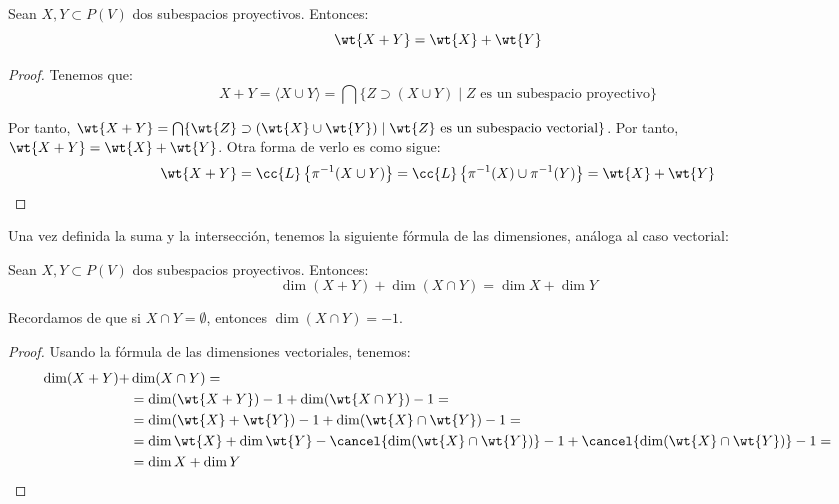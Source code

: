 \begin{prop}
    Sean $X,Y\subset P(V)$ dos subespacios proyectivos. Entonces:
    \begin{equation*}
        \wt{X+Y} = \wt{X} + \wt{Y}
    \end{equation*}
\end{prop}
\begin{proof}
    Tenemos que:
    \begin{equation*}
        X+Y = \langle X\cup Y\rangle = \bigcap \{Z\supset (X\cup Y)\mid Z\text{ es un subespacio proyectivo}\}
    \end{equation*}

    Por tanto, $\wt{X+Y} = \bigcap \{\wt{Z}\supset (\wt{X}\cup \wt{Y})\mid \wt{Z}\text{ es un subespacio vectorial}\}$. Por tanto, $\wt{X+Y} = \wt{X} + \wt{Y}$.
    Otra forma de verlo es como sigue:
    \begin{equation*}
        \wt{X+Y} = \cc{L}\left\{\pi^{-1}(X\cup Y)\right\} = \cc{L}\left\{\pi^{-1}(X) \cup \pi^{-1}(Y)\right\} = \wt{X} + \wt{Y}
    \end{equation*}
\end{proof}

Una vez definida la suma y la intersección, tenemos la siguiente fórmula de las dimensiones, análoga al caso vectorial:
\begin{prop}
    Sean $X,Y\subset P(V)$ dos subespacios proyectivos. Entonces:
    \begin{equation*}
        \dim (X+Y) + \dim (X\cap Y) = \dim X + \dim Y
    \end{equation*}

    Recordamos de que si $X\cap Y = \emptyset$, entonces $\dim (X\cap Y) = -1$.
\end{prop}
\begin{proof}
    Usando la fórmula de las dimensiones vectoriales, tenemos:
    \begin{equation*}
        \begin{split}
            \dim (X+Y) +& \dim (X\cap Y) =\\
            &= \dim (\wt{X+Y}) -1 + \dim (\wt{X\cap Y}) -1 =\\
            &= \dim (\wt{X} + \wt{Y}) -1 + \dim (\wt{X} \cap \wt{Y}) -1 =\\
            &= \dim \wt{X} + \dim \wt{Y}  - \cancel{\dim (\wt{X} \cap \wt{Y})} -1 + \cancel{\dim (\wt{X} \cap \wt{Y})} -1  =\\
            &= \dim X + \dim Y
        \end{split}
    \end{equation*}
\end{proof}

